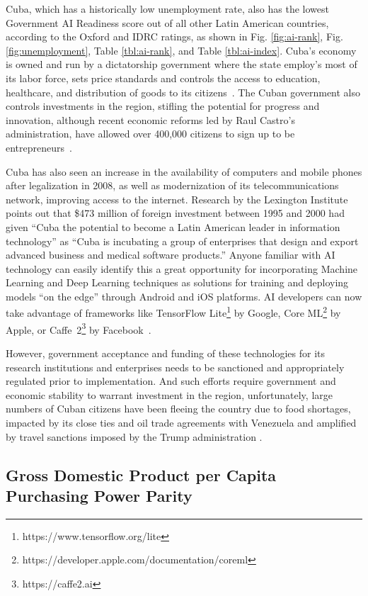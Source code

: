 \documentclass[conference]{IEEEtran}
\begin{document}
Cuba, which has a historically low unemployment rate, also has the lowest Government AI Readiness score out of all other Latin American countries, according to the Oxford and IDRC ratings, as shown in Fig. \ref{fig:ai-rank}, Fig. \ref{fig:unemployment}, Table \ref{tbl:ai-rank}, and Table \ref{tbl:ai-index}. Cuba's economy is owned and run by a dictatorship government where the state employ's most of its labor force, sets price standards and controls the access to education, healthcare, and distribution of goods to its citizens~\cite{smith2016understanding}. The Cuban government also controls investments in the region, stifling the potential for progress and innovation, although recent economic reforms led by Raul Castro's administration, have allowed over 400,000 citizens to sign up to be entrepreneurs~\cite{feinberg2012new}.

Cuba has also seen an increase in the availability of computers and mobile phones after legalization in 2008, as well as modernization of its telecommunications network, improving access to the internet. Research by the Lexington Institute~\cite{peters2001cuba} points out that \$473 million of foreign investment between 1995 and 2000 had given ``Cuba the potential to become a Latin American leader in information technology'' as ``Cuba is incubating a group of enterprises that design and export advanced business and medical software products.'' Anyone familiar with AI technology can easily identify this a great opportunity for incorporating Machine Learning and Deep Learning techniques as solutions for training and deploying models ``on the edge'' through Android and iOS platforms. AI developers can now take advantage of frameworks like TensorFlow Lite\footnote{https://www.tensorflow.org/lite} by Google, Core ML\footnote{https://developer.apple.com/documentation/coreml} by Apple, or Caffe~2\footnote{https://caffe2.ai} by Facebook~\cite{jia2016delivering}.

However, government acceptance and funding of these technologies for its research institutions and enterprises needs to be sanctioned and appropriately regulated prior to implementation. And such efforts require government and economic stability to warrant investment in the region, unfortunately, large numbers of Cuban citizens have been fleeing the country due to food shortages, impacted by its close ties and oil trade agreements with Venezuela and amplified by travel sanctions imposed by the Trump administration \cite{cordoba2019cuba}.


\subsection{Gross Domestic Product per Capita Purchasing Power Parity}
\end{document}

